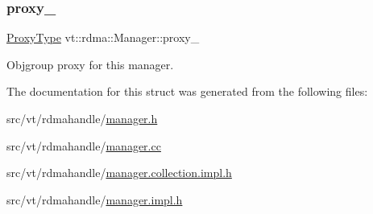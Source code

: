 \mbox{\label{structvt_1_1rdma_1_1_manager_a033b59b7b1ecdf7e813d2999c03134cb}} 
\subsubsection{\texorpdfstring{proxy\+\_\+}{proxy\_}}
{\footnotesize\ttfamily \hyperlink{structvt_1_1rdma_1_1_manager_a75d5cdc6428ea19f5ec665b04dcd7166}{Proxy\+Type} vt\+::rdma\+::\+Manager\+::proxy\+\_\+\hspace{0.3cm}{\ttfamily [private]}}



Objgroup proxy for this manager. 



The documentation for this struct was generated from the following files\+:\begin{DoxyCompactItemize}
\item 
src/vt/rdmahandle/\hyperlink{rdmahandle_2manager_8h}{manager.\+h}\item 
src/vt/rdmahandle/\hyperlink{rdmahandle_2manager_8cc}{manager.\+cc}\item 
src/vt/rdmahandle/\hyperlink{manager_8collection_8impl_8h}{manager.\+collection.\+impl.\+h}\item 
src/vt/rdmahandle/\hyperlink{rdmahandle_2manager_8impl_8h}{manager.\+impl.\+h}\end{DoxyCompactItemize}
